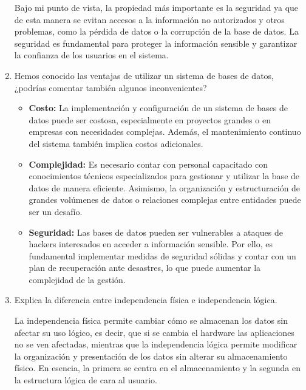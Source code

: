 \begin{enumerate}
    Bajo mi punto de vista, la propiedad más importante es la seguridad ya que de esta manera se evitan accesos a la información no autorizados y otros problemas, como la pérdida de datos o la corrupción de la base de datos. La seguridad es fundamental para proteger la información sensible y garantizar la confianza de los usuarios en el sistema.

    \item Hemos conocido las ventajas de utilizar un sistema de bases de datos, ¿podrías comentar también algunos inconvenientes?
    
    \begin{itemize}
        \item \textbf{Costo:} La implementación y configuración de un sistema de bases de datos puede ser costosa, especialmente en proyectos grandes o en empresas con necesidades complejas. Además, el mantenimiento continuo del sistema también implica costos adicionales.
        \item \textbf{Complejidad:} Es necesario contar con personal capacitado con conocimientos técnicos especializados para gestionar y utilizar la base de datos de manera eficiente. Asimismo, la organización y estructuración de grandes volúmenes de datos o relaciones complejas entre entidades puede ser un desafío.
        \item \textbf{Seguridad:} Las bases de datos pueden ser vulnerables a ataques de hackers interesados en acceder a información sensible. Por ello, es fundamental implementar medidas de seguridad sólidas y contar con un plan de recuperación ante desastres, lo que puede aumentar la complejidad de la gestión.
    \end{itemize}

    \item Explica la diferencia entre independencia física e independencia lógica.
    
    La independencia física permite cambiar cómo se almacenan los datos sin afectar su uso lógico, es decir, que si se cambia el hardware las aplicaciones no se ven afectadas, mientras que la independencia lógica permite modificar la organización y presentación de los datos sin alterar su almacenamiento físico. En esencia, la primera se centra en el almacenamiento y la segunda en la estructura lógica de cara al usuario.


\end{enumerate}
